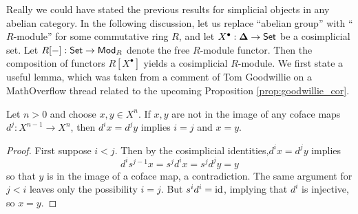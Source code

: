 Really we could have stated the previous results for simplicial objects in any abelian category. In the following discussion, let us replace ``abelian group'' with ``$R$-module'' for some commutative ring $R$, and let $X^\bullet: \boldsymbol{\Delta} \to \mathsf{Set}$ be a cosimplicial set. Let $R[-]:\mathsf{Set} \to \mathsf{Mod}_R$ denote the free $R$-module functor. Then the composition of functors $R[X^\bullet]$ yields a cosimplicial $R$-module. We first state a useful lemma, which was taken from a comment of Tom Goodwillie on a MathOverflow thread \cite{Goodwillie} related to the upcoming Proposition \ref{prop:goodwillie_cor}.
\begin{lem}\label{lem:goodwillie}
    Let $n>0$ and choose $x,y \in X^n$. If $x,y$ are not in the image of any coface maps $d^j: X^{n-1}\to X^n$, then $d^ix = d^jy$ implies $i=j$ and $x=y$.
    \begin{proof}
      First suppose $i<j$. Then by the cosimplicial identities,$d^ix = d^jy$ implies 
      \[d^i s^{j-1}x = s^jd^ix = s^jd^jy = y\]
      so that $y$ is in the image of a coface map, a contradiction. The same argument for $j<i$ leaves only the possibility $i=j$. But $s^id^i =\operatorname{id}$, implying that $d^i$ is injective, so $x=y$.
    \end{proof} 
\end{lem}
